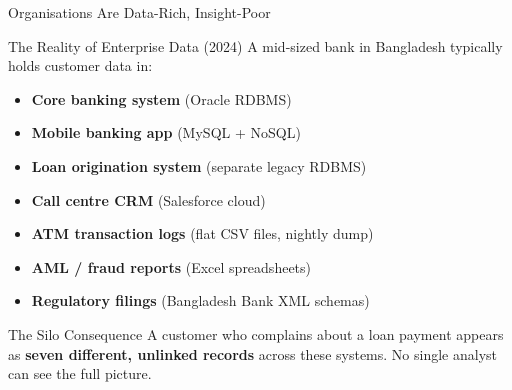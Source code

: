 \documentclass[aspectratio=169,10pt]{beamer}
\begin{document}
\begin{frame}{Organisations Are Data-Rich, Insight-Poor}
 
      \begin{block}{The Reality of Enterprise Data (2024)}
        A mid-sized bank in Bangladesh typically holds customer data in:
        \begin{itemize}
          \item \textbf{Core banking system} (Oracle RDBMS)
          \item \textbf{Mobile banking app} (MySQL + NoSQL)
          \item \textbf{Loan origination system} (separate legacy RDBMS)
          \item \textbf{Call centre CRM} (Salesforce cloud)
          \item \textbf{ATM transaction logs} (flat CSV files, nightly dump)
          \item \textbf{AML / fraud reports} (Excel spreadsheets)
          \item \textbf{Regulatory filings} (Bangladesh Bank XML schemas)
        \end{itemize}
      \end{block}
      \vspace{4pt}
      \begin{alertblock}{The Silo Consequence}
        A customer who complains about a loan payment appears as \textbf{seven different, unlinked records} across these systems.  No single analyst can see the full picture.
      \end{alertblock}

     
\end{frame}
\end{document}
